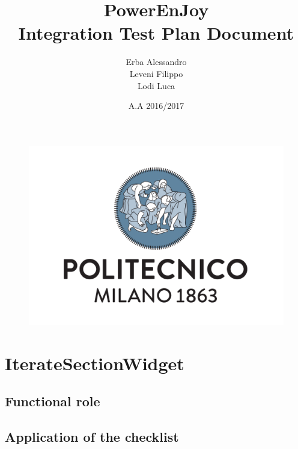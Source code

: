 \documentclass[english]{article}
\begin{document}
\lstset{language=Java} 

	\begin{figure}
		\centering
		\includegraphics[scale=0.5]{logo.pdf} 
	\end{figure}


	\title{PowerEnJoy\\
	Integration Test Plan Document\\
	}

	\date{A.A 2016/2017}
	
	\author{Erba Alessandro\\
	 Leveni Filippo\\
	 Lodi Luca}
	
	\maketitle
	\pagebreak{}
	\tableofcontents{} \pagebreak{}
	
\section{IterateSectionWidget}
	\subsection{Functional role}
	\subsection{Application of the checklist}
	
\end{document}
